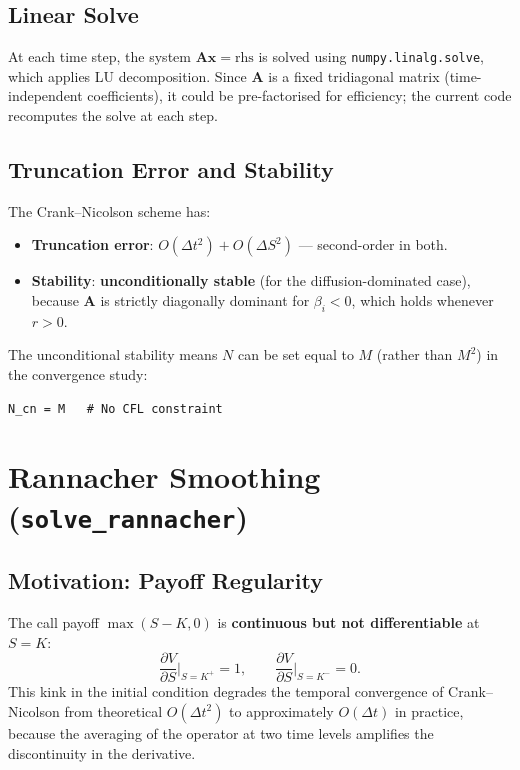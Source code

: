 \documentclass[12pt, a4paper]{article}
\begin{document}
\subsection{Linear Solve}

At each time step, the system $\mathbf{A}\bm{x} = \text{rhs}$ is solved using
\texttt{numpy.linalg.solve}, which applies LU decomposition. Since $\mathbf{A}$
is a fixed tridiagonal matrix (time-independent coefficients), it could be
pre-factorised for efficiency; the current code recomputes the solve at each
step.

\subsection{Truncation Error and Stability}

The Crank--Nicolson scheme has:
\begin{itemize}[noitemsep]
    \item \textbf{Truncation error}: $O(\Delta t^2) + O(\Delta S^2)$ — second-order in both.
    \item \textbf{Stability}: \textbf{unconditionally stable} (for the diffusion-dominated case), because $\mathbf{A}$ is strictly diagonally dominant for $\beta_i < 0$, which holds whenever $r > 0$.
\end{itemize}

The unconditional stability means $N$ can be set equal to $M$ (rather than
$M^2$) in the convergence study:
\begin{lstlisting}
N_cn = M   # No CFL constraint
\end{lstlisting}

\section{Rannacher Smoothing (\texttt{solve\_rannacher})}

\subsection{Motivation: Payoff Regularity}

The call payoff $\max(S - K, 0)$ is \textbf{continuous but not differentiable}
at $S = K$:
\[
    \frac{\partial V}{\partial S}\bigg|_{S=K^+} = 1,
    \qquad
    \frac{\partial V}{\partial S}\bigg|_{S=K^-} = 0.
\]
This kink in the initial condition degrades the temporal convergence of
Crank--Nicolson from theoretical $O(\Delta t^2)$ to approximately $O(\Delta t)$
in practice, because the averaging of the operator at two time levels amplifies
the discontinuity in the derivative.
\end{document}
